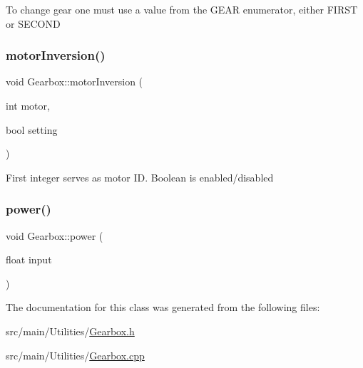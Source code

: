 To change gear one must use a value from the G\+E\+AR enumerator, either F\+I\+R\+ST or S\+E\+C\+O\+ND \mbox{\label{classGearbox_a50c38e09098353b2b250ba9835593d1f}} 
\subsubsection{\texorpdfstring{motor\+Inversion()}{motorInversion()}}
{\footnotesize\ttfamily void Gearbox\+::motor\+Inversion (\begin{DoxyParamCaption}\item[{int}]{motor,  }\item[{bool}]{setting }\end{DoxyParamCaption})}

First integer serves as motor ID. Boolean is enabled/disabled \mbox{\label{classGearbox_a18c2ea864caee36934286130b89ca310}} 
\subsubsection{\texorpdfstring{power()}{power()}}
{\footnotesize\ttfamily void Gearbox\+::power (\begin{DoxyParamCaption}\item[{float}]{input }\end{DoxyParamCaption})}



The documentation for this class was generated from the following files\+:\begin{DoxyCompactItemize}
\item 
src/main/\+Utilities/\hyperlink{Gearbox_8h}{Gearbox.\+h}\item 
src/main/\+Utilities/\hyperlink{Gearbox_8cpp}{Gearbox.\+cpp}\end{DoxyCompactItemize}
